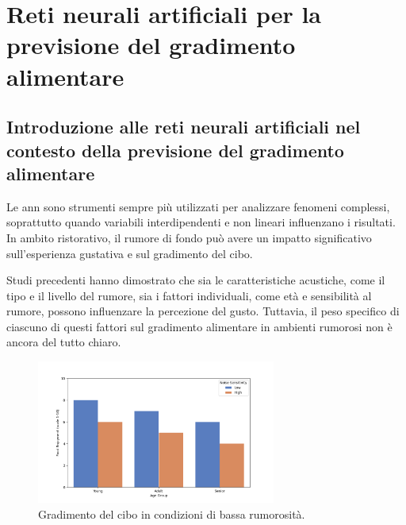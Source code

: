 
%

\chapter{Reti neurali artificiali per la previsione del gradimento alimentare}
\label{cha:chapter4}

\section{Introduzione alle reti neurali artificiali nel contesto della previsione del gradimento alimentare}

Le \gls{ann} sono strumenti sempre più utilizzati per analizzare fenomeni complessi, soprattutto quando variabili interdipendenti e non lineari influenzano i risultati. In ambito ristorativo, il rumore di fondo può avere un impatto significativo sull'esperienza gustativa e sul gradimento del cibo.

Studi precedenti hanno dimostrato che sia le caratteristiche acustiche, come il tipo e il livello del rumore, sia i fattori individuali, come età e sensibilità al rumore, possono influenzare la percezione del gusto. Tuttavia, il peso specifico di ciascuno di questi fattori sul gradimento alimentare in ambienti rumorosi non è ancora del tutto chiaro. \cite{spence2014}

\begin{figure}[H]
      \centering
      \includegraphics[width=0.7\textwidth]{Chapters/Figures/age_ecc.png}
      \caption{\small Gradimento del cibo in condizioni di bassa rumorosità.}
      \label{fig:age}
  \end{figure}

